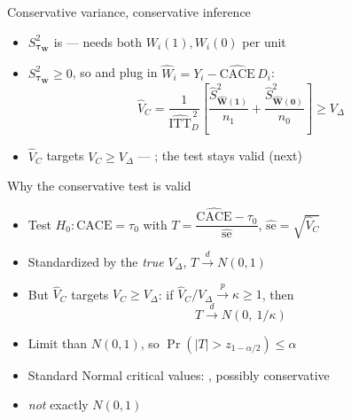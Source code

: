 \documentclass[table, xcolor = {dvipsnames}, 9pt]{beamer}
\theoremstyle{plain}
\newcommand{\mh}[1]{{\color{magenta}{#1}}}
\newcommand{\CACE}{\mathrm{CACE}}
\newcommand{\hITTD}{\widehat{\mathrm{ITT}}_D}
\begin{document}
\begin{frame}[t]{Conservative variance, conservative inference}
\vfill
\begin{itemize} \vfill
\item $S^2_{\bm{\tau}_{\bm{W}}}$ is \mh{not identified} --- needs both $W_i(1), W_i(0)$ per unit \vfill
\item $S^2_{\bm{\tau}_{\bm{W}}} \geq 0$, so \mh{drop it} and plug in $\widehat{W}_i = Y_i - \widehat{\CACE}\, D_i$: \vfill
\vfill
\begin{equation*}
\widehat{V}_C = \frac{1}{\hITTD^{\,2}}\left[\frac{\hat{S}^2_{\widehat{\bm{W}}(\bm{1})}}{n_1} + \frac{\hat{S}^2_{\widehat{\bm{W}}(\bm{0})}}{n_0}\right] \geq V_\Delta
\end{equation*} \vfill
\item $\widehat{V}_C$ targets $V_C \geq V_\Delta$ --- \mh{conservative}; the test stays valid (next) \vfill
\end{itemize} \vfill
\end{frame}
\begin{frame}[t]{Why the conservative test is valid}
\vfill
\begin{itemize} \vfill
\item Test $H_0: \CACE = \tau_0$ with $T = \dfrac{\widehat{\CACE} - \tau_0}{\widehat{\text{se}}}$, \quad $\widehat{\text{se}} = \sqrt{\widehat{V}_C}$ \vfill
\item Standardized by the \emph{true} $V_\Delta$, $T \overset{d}{\longrightarrow} N(0, 1)$ \vfill
\item But $\widehat{V}_C$ targets $V_C \geq V_\Delta$: if $\widehat{V}_C / V_\Delta \overset{p}{\longrightarrow} \kappa \geq 1$, then \vfill
\vfill
\begin{equation*}
T \overset{d}{\longrightarrow} N\!\left(0,\ 1/\kappa\right)
\end{equation*} \vfill
\item Limit \mh{no wider} than $N(0, 1)$, so $\Pr\!\left(\lvert T\rvert > z_{1 - \alpha/2}\right) \leq \alpha$ \vfill
\item Standard Normal critical values: \mh{valid}, possibly conservative \vfill
\item[] \emph{not} exactly $N(0, 1)$ \vfill
\end{itemize} \vfill
\end{frame}
\end{document}
